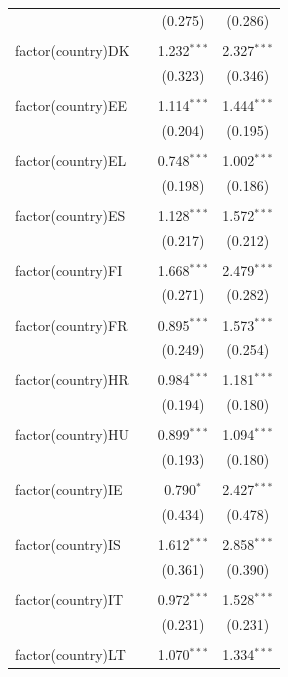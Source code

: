 \begin{table}[!htbp]
\begin{tabular}{@{\extracolsep{5pt}}lccc}
  &  & (0.275) & (0.286) \\ 
  & & & \\ 
 factor(country)DK &  & 1.232$^{***}$ & 2.327$^{***}$ \\ 
  &  & (0.323) & (0.346) \\ 
  & & & \\ 
 factor(country)EE &  & 1.114$^{***}$ & 1.444$^{***}$ \\ 
  &  & (0.204) & (0.195) \\ 
  & & & \\ 
 factor(country)EL &  & 0.748$^{***}$ & 1.002$^{***}$ \\ 
  &  & (0.198) & (0.186) \\ 
  & & & \\ 
 factor(country)ES &  & 1.128$^{***}$ & 1.572$^{***}$ \\ 
  &  & (0.217) & (0.212) \\ 
  & & & \\ 
 factor(country)FI &  & 1.668$^{***}$ & 2.479$^{***}$ \\ 
  &  & (0.271) & (0.282) \\ 
  & & & \\ 
 factor(country)FR &  & 0.895$^{***}$ & 1.573$^{***}$ \\ 
  &  & (0.249) & (0.254) \\ 
  & & & \\ 
 factor(country)HR &  & 0.984$^{***}$ & 1.181$^{***}$ \\ 
  &  & (0.194) & (0.180) \\ 
  & & & \\ 
 factor(country)HU &  & 0.899$^{***}$ & 1.094$^{***}$ \\ 
  &  & (0.193) & (0.180) \\ 
  & & & \\ 
 factor(country)IE &  & 0.790$^{*}$ & 2.427$^{***}$ \\ 
  &  & (0.434) & (0.478) \\ 
  & & & \\ 
 factor(country)IS &  & 1.612$^{***}$ & 2.858$^{***}$ \\ 
  &  & (0.361) & (0.390) \\ 
  & & & \\ 
 factor(country)IT &  & 0.972$^{***}$ & 1.528$^{***}$ \\ 
  &  & (0.231) & (0.231) \\ 
  & & & \\ 
 factor(country)LT &  & 1.070$^{***}$ & 1.334$^{***}$ \\ 

\end{tabular}
\end{table}
